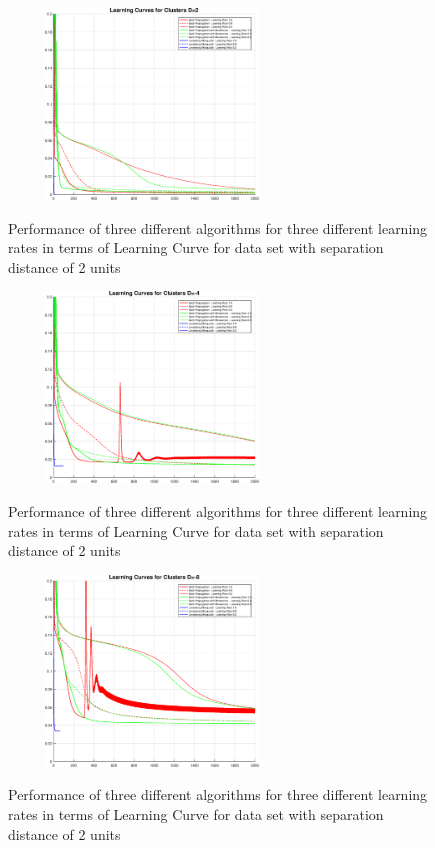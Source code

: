 \documentclass[conference]{IEEEtran}
\begin{document}
\begin{figure}
\centering
{\includegraphics[width=3in,height=2in,clip,keepaspectratio]{Exp1_LC2.eps} }
\caption{Performance of three different algorithms for three different learning rates in terms of Learning Curve for data set with separation distance of 2 units }
\end{figure}
\begin{figure}
\centering
{\includegraphics[width=3in,height=2in,clip,keepaspectratio]{Exp1_LCn4.eps} }\\
\caption{Performance of three different algorithms for three different learning rates in terms of Learning Curve for data set with separation distance of 2 units}
\end{figure}
\begin{figure}
\centering
{\includegraphics[width=3in,height=2in,clip,keepaspectratio]{Exp1_LCn8.eps} }\\
\caption{Performance of three different algorithms for three different learning rates in terms of Learning Curve for data set with separation distance of 2 units}
\end{figure}
\end{document}

